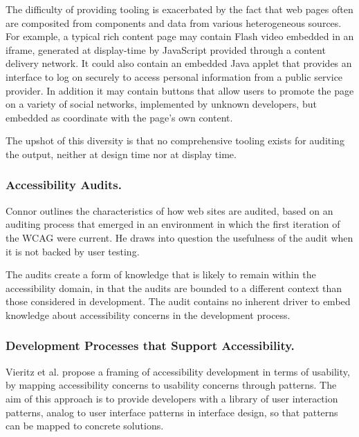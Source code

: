 	The difficulty  of providing tooling is exacerbated by the fact that web pages often are composited from components and data from various heterogeneous sources. For example, a typical rich content page may contain Flash video embedded in an iframe, generated at display-time by JavaScript provided through a content delivery network. It could also contain an embedded Java applet that provides an interface to log on securely to access personal information from a public service provider. In addition it may contain buttons that allow users to promote the page on a variety of social networks, implemented by unknown developers, but embedded as coordinate with the page's own content.

	The upshot of this diversity is that no comprehensive tooling exists for auditing the output, neither at design time nor at display time.


\subsubsection{Accessibility Audits.} %
	\label{ssub:current_testing_practices_}
	
	Connor \cite{Connor:2010} outlines the characteristics of how web sites are audited, based on an auditing process that emerged in an environment in which the first iteration of the \ac{WCAG} were current. He draws into question the usefulness of the audit when it is not backed by user testing. 

	The audits create a form of knowledge that is likely to remain within the accessibility domain, in that the audits are bounded to a different context than those considered in development. The audit contains no inherent driver to embed knowledge about accessibility concerns in the development process.  

\subsubsection{Development Processes that Support Accessibility.} %
	\label{ssub:proposed_solutions_}
	Vieritz et al. \cite{Vieritz:2010} propose a framing of accessibility development in terms of usability, by mapping accessibility concerns to usability concerns through patterns. The aim of this approach is to provide developers with a library of user interaction patterns, analog to user interface patterns in interface design, so that patterns can be mapped to concrete solutions.

